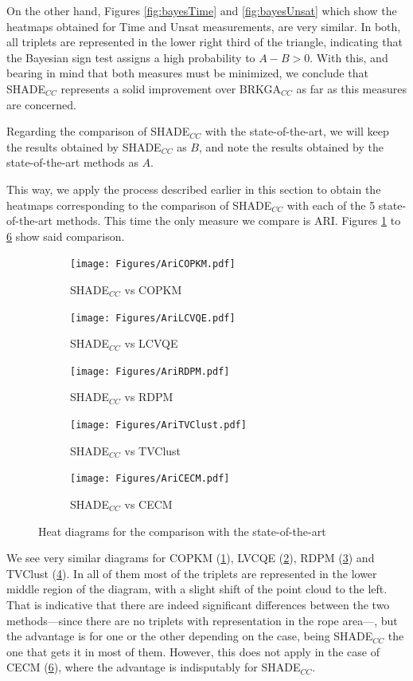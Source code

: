 \documentclass[review]{elsarticle}
\begin{document}
On the other hand, Figures \ref{fig:bayesTime} and \ref{fig:bayesUnsat} which show the heatmaps obtained for Time and Unsat measurements, are very similar. In both, all triplets are represented in the lower right third of the triangle, indicating that the Bayesian sign test assigns a high probability to $A - B > 0$. With this, and bearing in mind that both measures must be minimized, we conclude that SHADE$_{CC}$ represents a solid improvement over BRKGA$_{CC}$ as far as this measures are concerned.

Regarding the comparison of SHADE$_{CC}$ with the state-of-the-art, we will keep the results obtained by SHADE$_{CC}$ as $B$, and note the results obtained by the state-of-the-art methods as $A$.

This way, we apply the process described earlier in this section to obtain the heatmaps corresponding to the comparison of SHADE$_{CC}$ with each of the 5 state-of-the-art methods. This time the only measure we compare is ARI. Figures \ref{fig:bayesCOPKM} to \ref{fig:bayesCECM} show said comparison.

\begin{figure}[ht!]
	\centering
	\begin{subfigure}{.45\textwidth}
		\texttt{[image: Figures/AriCOPKM.pdf]}
		\caption{SHADE$_{CC}$ vs COPKM}
		\label{fig:bayesCOPKM}
	\end{subfigure}
	\begin{subfigure}{.45\textwidth}
		\texttt{[image: Figures/AriLCVQE.pdf]}
		\caption{SHADE$_{CC}$ vs LCVQE}
		\label{fig:bayesLCVQE}
	\end{subfigure}
	\begin{subfigure}{.45\textwidth}
		\texttt{[image: Figures/AriRDPM.pdf]}
		\caption{SHADE$_{CC}$ vs RDPM}
		\label{fig:bayesRDPM}
	\end{subfigure}
	\begin{subfigure}{.45\textwidth}
		\texttt{[image: Figures/AriTVClust.pdf]}
		\caption{SHADE$_{CC}$ vs TVClust}
		\label{fig:bayesTVClust}
	\end{subfigure}
	\begin{subfigure}{.45\textwidth}
		\texttt{[image: Figures/AriCECM.pdf]}
		\caption{SHADE$_{CC}$ vs CECM}
		\label{fig:bayesCECM}
	\end{subfigure}
	\caption{Heat diagrams for the comparison with the state-of-the-art}
\end{figure}

We see very similar diagrams for COPKM (\ref{fig:bayesCOPKM}), LVCQE (\ref{fig:bayesLCVQE}), RDPM (\ref{fig:bayesRDPM}) and TVClust (\ref{fig:bayesTVClust}). In all of them most of the triplets are represented in the lower middle region of the diagram, with a slight shift of the point cloud to the left. That is indicative that there are indeed significant differences between the two methods---since there are no triplets with representation in the rope area---, but the advantage is for one or the other depending on the case, being SHADE$_{CC}$ the one that gets it in most of them. However, this does not apply in the case of CECM (\ref{fig:bayesCECM}), where the advantage is indisputably for SHADE$_{CC}$.
\end{document}
